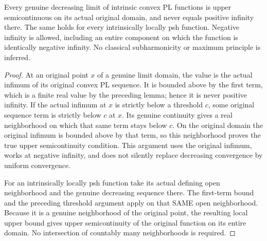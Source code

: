 \begin{theorem}
\label{scheme:actual-native-local-psh-upper-semicontinuity}
\leanok
{}
Every genuine decreasing limit of intrinsic convex PL functions is upper
semicontinuous on its actual original domain, and never equals positive
infinity there. The same holds for every intrinsically locally psh function.
Negative infinity is allowed, including an entire component on which the
function is identically negative infinity. No classical subharmonicity or
maximum principle is inferred.
\end{theorem}
\begin{proof}
At an original point $x$ of a genuine limit domain, the value is the actual
infimum of its original convex PL sequence. It is bounded above by the first
term, which is a finite real value by the preceding lemma; hence it is never
positive infinity. If the actual infimum at $x$ is strictly below a threshold
$c$, some original sequence term is strictly below $c$ at $x$. Its genuine
continuity gives a real neighborhood on which that same term stays below $c$.
On the original domain the original infimum is bounded above by that term,
so this neighborhood proves the true upper semicontinuity condition. This
argument uses the original infimum, works at negative infinity, and does not
silently replace decreasing convergence by uniform convergence.

For an intrinsically locally psh function take its actual defining open
neighborhood and the genuine decreasing sequence there. The first-term bound
and the preceding threshold argument apply on that SAME open neighborhood.
Because it is a genuine neighborhood of the original point, the resulting
local upper bound gives upper semicontinuity of the original function on its
entire domain. No intersection of countably many neighborhoods is required.
\end{proof}

